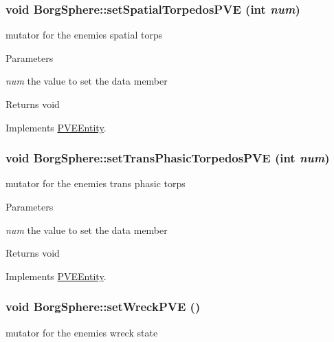 \hypertarget{classBorgSphere_a6d1e29d992a4afc48f125e7fff1d89f8}{
\subsubsection[{setSpatialTorpedosPVE}]{\setlength{\rightskip}{0pt plus 5cm}void BorgSphere::setSpatialTorpedosPVE (int {\em num})}}
\label{d6/ddd/classBorgSphere_a6d1e29d992a4afc48f125e7fff1d89f8}
mutator for the enemies spatial torps


\begin{DoxyParams}{Parameters}
\item[{\em num}]the value to set the data member\end{DoxyParams}
\begin{DoxyReturn}{Returns}
void 
\end{DoxyReturn}


Implements \hyperlink{classPVEEntity}{PVEEntity}.

\hypertarget{classBorgSphere_aabcf70cfb1cb902c44206c6cfb20b159}{
\subsubsection[{setTransPhasicTorpedosPVE}]{\setlength{\rightskip}{0pt plus 5cm}void BorgSphere::setTransPhasicTorpedosPVE (int {\em num})}}
\label{d6/ddd/classBorgSphere_aabcf70cfb1cb902c44206c6cfb20b159}
mutator for the enemies trans phasic torps


\begin{DoxyParams}{Parameters}
\item[{\em num}]the value to set the data member\end{DoxyParams}
\begin{DoxyReturn}{Returns}
void 
\end{DoxyReturn}


Implements \hyperlink{classPVEEntity}{PVEEntity}.

\hypertarget{classBorgSphere_add9fba918808e2183004ece0a488c854}{
\subsubsection[{setWreckPVE}]{\setlength{\rightskip}{0pt plus 5cm}void BorgSphere::setWreckPVE ()}}
\label{d6/ddd/classBorgSphere_add9fba918808e2183004ece0a488c854}
mutator for the enemies wreck state

